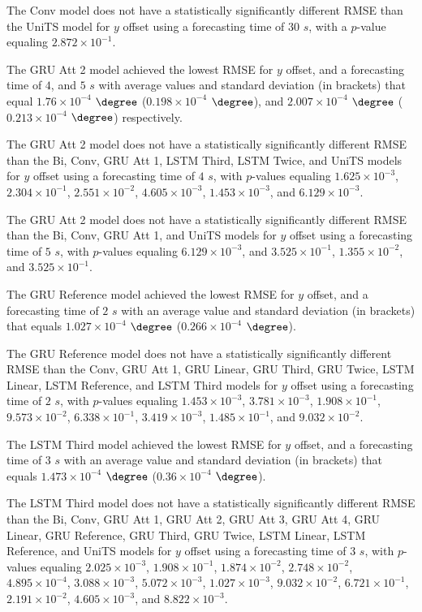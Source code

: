The Conv model does not have a statistically significantly different RMSE than the UniTS model for $y$ offset using a forecasting time of $30$ $s$, with a $p$-value equaling $2.872 \times 10^{-1}$.

The GRU Att 2 model achieved the lowest RMSE for $y$ offset, and a forecasting time of $4$, and $5$ $s$ with average values and standard deviation (in brackets) that equal $1.76 \times 10^{-4}$ $\degree$ ($0.198 \times 10^{-4}$ $\degree$), and $2.007 \times 10^{-4}$ $\degree$ ($0.213 \times 10^{-4}$ $\degree$) respectively.

The GRU Att 2 model does not have a statistically significantly different RMSE than the Bi, Conv, GRU Att 1, LSTM Third, LSTM Twice, and UniTS models for $y$ offset using a forecasting time of $4$ $s$, with $p$-values equaling $1.625 \times 10^{-3}$, $2.304 \times 10^{-1}$, $2.551 \times 10^{-2}$, $4.605 \times 10^{-3}$, $1.453 \times 10^{-3}$, and $6.129 \times 10^{-3}$.

The GRU Att 2 model does not have a statistically significantly different RMSE than the Bi, Conv, GRU Att 1, and UniTS models for $y$ offset using a forecasting time of $5$ $s$, with $p$-values equaling $6.129 \times 10^{-3}$, and $3.525 \times 10^{-1}$, $1.355 \times 10^{-2}$, and $3.525 \times 10^{-1}$.

The GRU Reference model achieved the lowest RMSE for $y$ offset, and a forecasting time of $2$ $s$ with an average value and standard deviation (in brackets) that equals $1.027 \times 10^{-4}$ $\degree$ ($0.266 \times 10^{-4}$ $\degree$).

The GRU Reference model does not have a statistically significantly different RMSE than the Conv, GRU Att 1, GRU Linear, GRU Third, GRU Twice, LSTM Linear, LSTM Reference, and LSTM Third models for $y$ offset using a forecasting time of $2$ $s$, with $p$-values equaling $1.453 \times 10^{-3}$, $3.781 \times 10^{-3}$, $1.908 \times 10^{-1}$, $9.573 \times 10^{-2}$, $6.338 \times 10^{-1}$, $3.419 \times 10^{-3}$, $1.485 \times 10^{-1}$, and $9.032 \times 10^{-2}$.

The LSTM Third model achieved the lowest RMSE for $y$ offset, and a forecasting time of $3$ $s$ with an average value and standard deviation (in brackets) that equals $1.473 \times 10^{-4}$ $\degree$ ($0.36 \times 10^{-4}$ $\degree$).

The LSTM Third model does not have a statistically significantly different RMSE than the Bi, Conv, GRU Att 1, GRU Att 2, GRU Att 3, GRU Att 4, GRU Linear, GRU Reference, GRU Third, GRU Twice, LSTM Linear, LSTM Reference, and UniTS models for $y$ offset using a forecasting time of $3$ $s$, with $p$-values equaling $2.025 \times 10^{-3}$, $1.908 \times 10^{-1}$, $1.874 \times 10^{-2}$, $2.748 \times 10^{-2}$, $4.895 \times 10^{-4}$, $3.088 \times 10^{-3}$, $5.072 \times 10^{-3}$, $1.027 \times 10^{-3}$, $9.032 \times 10^{-2}$, $6.721 \times 10^{-1}$, $2.191 \times 10^{-2}$, $4.605 \times 10^{-3}$, and $8.822 \times 10^{-3}$.

